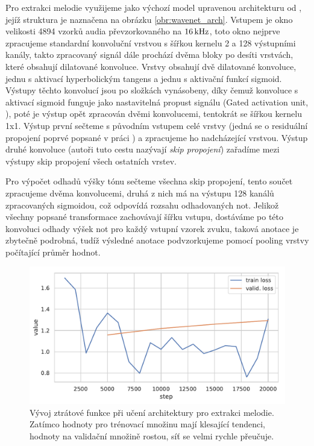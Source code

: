 Pro extrakci melodie využijeme jako výchozí model upravenou architekturu od \cite{Martak2018}, jejíž struktura je naznačena na obrázku \ref{obr:wavenet_arch}. Vstupem je okno velikosti 4894 vzorků audia převzorkovaného na $16\,\rm kHz$, toto okno nejprve zpracujeme standardní konvoluční vrstvou s šířkou kernelu 2 a 128 výstupními kanály, takto zpracovaný signál dále prochází dvěma bloky po desíti vrstvách, které obsahují dilatované konvoluce. Vrstvy obsahují dvě dilatované konvoluce, jednu s aktivací hyperbolickým tangens a jednu s aktivační funkcí sigmoid. Výstupy těchto konvolucí jsou po složkách vynásobeny, díky čemuž konvoluce s aktivací sigmoid funguje jako nastavitelná propust signálu (Gated activation unit, \cite{Oord2016a}), poté je výstup opět zpracován dvěmi konvolucemi, tentokrát se šířkou kernelu 1x1. Výstup první sečteme s původním vstupem celé vrstvy (jedná se o residuální propojení poprvé popsané v práci \cite{He2015}) a zpracujeme ho nadcházející vrstvou. Výstup druhé konvoluce (autoři tuto cestu nazývají \emph{skip propojení}) zařadíme mezi výstupy skip propojení všech ostatních vrstev.

Pro výpočet odhadů výšky tónu sečteme všechna skip propojení, tento součet zpracujeme dvěma konvolucemi, druhá z nich má na výstupu 128 kanálů zpracovaných sigmoidou, což odpovídá rozsahu odhadovaných not. Jelikož všechny popsané transformace zachovávají šířku vstupu, dostáváme po této konvoluci odhady výšek not pro každý vstupní vzorek zvuku, taková anotace je zbytečně podrobná, tudíž výsledné anotace podvzorkujeme pomocí pooling vrstvy počítající průměr hodnot.

\begin{figure}[h]\centering
    \includegraphics[scale=0.6]{../img/figures/wavenet_overfit}
    \caption{Vývoj ztrátové funkce při učení architektury \cite{Martak2018} pro extrakci melodie. Zatímco hodnoty pro trénovací množinu mají klesající tendenci, hodnoty na validační množině rostou, síť se velmi rychle přeučuje.}\label{obr:wavenet_overfit}
\end{figure}

